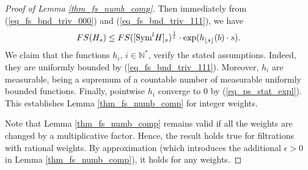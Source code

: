 \documentclass[12pt]{article}
\numberwithin{equation}{section}
\theoremstyle{theorem}
\theoremstyle{definition}
\theoremstyle{remark}
\newcommand{\nat}{\mathbb{N}}
\begin{document}
\begin{proof}[Proof of Lemma \ref{thm_fs_numb_comp}]
		Then immediately from (\ref{eq_fs_bnd_triv_000}) and (\ref{eq_fs_bnd_triv_111}), we have
		\begin{equation}
			FS(H_s)
			\leq 
			FS([{\rm{Sym}}^l H]_s)^{\frac{1}{l}}
			\cdot
			\exp(h_{\lfloor s \rfloor}(b) \cdot s).
		\end{equation}
		We claim that the functions $h_i$, $i \in \nat^*$, verify the stated assumptions.
		Indeed, they are uniformly bounded by (\ref{eq_fs_bnd_triv_111}).
		Moreover, $h_i$ are measurable, being a supremum of a countable number of measurable uniformly bounded functions.
		Finally, pointwise $h_i$ converge to $0$ by  (\ref{eq_ps_stat_expl}).
		This establishes Lemma \ref{thm_fs_numb_comp} for integer weights.
		\par 
		Note that Lemma \ref{thm_fs_numb_comp} remains valid if all the weights are changed by a multiplicative factor.
		Hence, the result holds true for filtrations with rational weights.
		By approximation (which introduces the additional $\epsilon > 0$ in Lemma \ref{thm_fs_numb_comp}), it holds for any weights.
	\end{proof}
	
	
\end{document}
